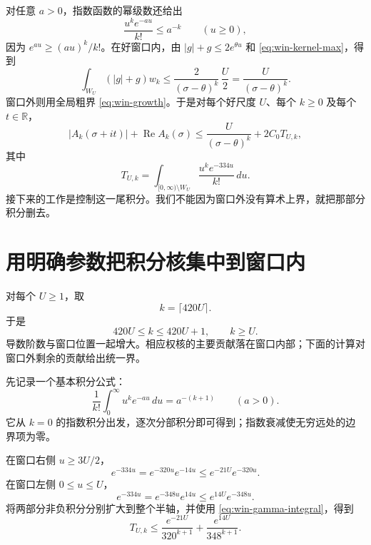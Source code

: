 \documentclass[UTF8,fontset=fandol,a4paper,openany,oneside]{ctexbook}
\theoremstyle{definition}
\theoremstyle{remark}
\begin{document}
对任意 $a>0$，指数函数的幂级数还给出
\begin{equation}
 \frac{u^ke^{-au}}{k!}\le a^{-k}\qquad(u\ge0),
 \label{eq:win-kernel-max}
\end{equation}
因为 $e^{au}\ge(au)^k/k!$。在好窗口内，由
$|g|+g\le2e^{\theta u}$ 和 \eqref{eq:win-kernel-max}，得到
\[
 \int_{W_U}(|g|+g)w_k
 \le \frac{2}{(\sigma-\theta)^k}\,\frac U2
 =\frac{U}{(\sigma-\theta)^k}.
\]
窗口外则用全局粗界 \eqref{eq:win-growth}。于是对每个好尺度 $U$、每个 $k\ge0$ 及每个 $t\in\mathbb R$，
\begin{equation}
 |A_k(\sigma+it)|+\operatorname{Re}A_k(\sigma)
 \le \frac{U}{(\sigma-\theta)^k}+2C_0T_{U,k},
 \label{eq:win-before-tail}
\end{equation}
其中
\[
 T_{U,k}=
 \int_{[0,\infty)\setminus W_U}
       \frac{u^ke^{-334u}}{k!}\,du.
\]
接下来的工作是控制这一尾积分。我们不能因为窗口外没有算术上界，就把那部分积分删去。

\section{用明确参数把积分核集中到窗口内}

对每个 $U\ge1$，取
\begin{equation}
 k=\lceil420U\rceil.
 \label{eq:win-k-choice}
\end{equation}
于是
\[
 420U\le k\le420U+1,\qquad k\ge U.
\]
导数阶数与窗口位置一起增大。相应权核的主要贡献落在窗口内部；下面的计算对窗口外剩余的贡献给出统一界。

先记录一个基本积分公式：
\begin{equation}
 \frac1{k!}\int_0^\infty u^ke^{-au}\,du
       =a^{-(k+1)}\qquad(a>0).
 \label{eq:win-gamma-integral}
\end{equation}
它从 $k=0$ 的指数积分出发，逐次分部积分即可得到；指数衰减使无穷远处的边界项为零。

在窗口右侧 $u\ge3U/2$，
\[
 e^{-334u}=e^{-320u}e^{-14u}
       \le e^{-21U}e^{-320u}.
\]
在窗口左侧 $0\le u\le U$，
\[
 e^{-334u}=e^{-348u}e^{14u}
       \le e^{14U}e^{-348u}.
\]
将两部分非负积分分别扩大到整个半轴，并使用
\eqref{eq:win-gamma-integral}，得到
\begin{equation}
 T_{U,k}\le
 \frac{e^{-21U}}{320^{k+1}}
 +\frac{e^{14U}}{348^{k+1}}.
 \label{eq:win-tail-two}
\end{equation}
\end{document}
